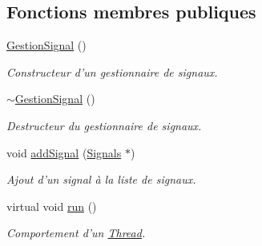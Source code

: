 \subsection*{Fonctions membres publiques}
\begin{DoxyCompactItemize}
\item 
\hypertarget{classGestionSignal_af7ab58d9b5971b4b67eec295b76d3b4a}{
\hyperlink{classGestionSignal_af7ab58d9b5971b4b67eec295b76d3b4a}{GestionSignal} ()}
\label{classGestionSignal_af7ab58d9b5971b4b67eec295b76d3b4a}

\begin{DoxyCompactList}\small\item\em Constructeur d'un gestionnaire de signaux. \item\end{DoxyCompactList}\item 
\hypertarget{classGestionSignal_ae28c5d1d8dcda2ff2cd007f89c5d193d}{
\hyperlink{classGestionSignal_ae28c5d1d8dcda2ff2cd007f89c5d193d}{$\sim$GestionSignal} ()}
\label{classGestionSignal_ae28c5d1d8dcda2ff2cd007f89c5d193d}

\begin{DoxyCompactList}\small\item\em Destructeur du gestionnaire de signaux. \item\end{DoxyCompactList}\item 
void \hyperlink{classGestionSignal_a0b729617a3132c6f3227072511ffcb63}{addSignal} (\hyperlink{classSignals}{Signals} $\ast$)
\begin{DoxyCompactList}\small\item\em Ajout d'un signal à la liste de signaux. \item\end{DoxyCompactList}\item 
\hypertarget{classGestionSignal_a4fa2c7af04eaf98de9169709696c1c93}{
virtual void \hyperlink{classGestionSignal_a4fa2c7af04eaf98de9169709696c1c93}{run} ()}
\label{classGestionSignal_a4fa2c7af04eaf98de9169709696c1c93}

\begin{DoxyCompactList}\small\item\em Comportement d'un \hyperlink{classThread}{Thread}. \item\end{DoxyCompactList}\end{DoxyCompactItemize}
